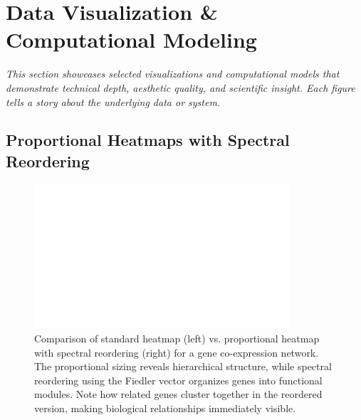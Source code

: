 
\section*{Data Visualization \& Computational Modeling}

\vspace{0.5em}

\textit{This section showcases selected visualizations and computational models that demonstrate technical depth, aesthetic quality, and scientific insight. Each figure tells a story about the underlying data or system.}

\vspace{1em}


\subsection*{Proportional Heatmaps with Spectral Reordering}

\begin{figure}[h]
\centering
\includegraphics[width=0.85\textwidth]{assets/tool_mheatmap_1.png}
\caption{Comparison of standard heatmap (left) vs. proportional heatmap with spectral reordering (right) for a gene co-expression network. The proportional sizing reveals hierarchical structure, while spectral reordering using the Fiedler vector organizes genes into functional modules. Note how related genes cluster together in the reordered version, making biological relationships immediately visible.}
\end{figure}

